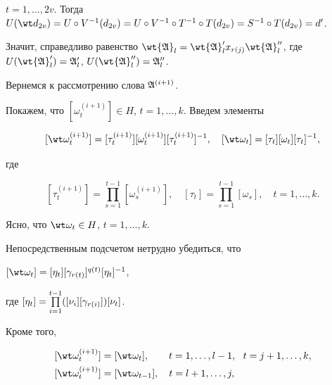 $t=1,\dotsc,2v$. Тогда $U(\wt d_{2v})=U\circ


V^{-1}(d_{2v})=U\circ V^{-1}\circ T^{-1}


\circ T(d_{2v})=S^{-1}\circ T(d_{{2v}})=d'$.


Значит, справедливо равенство $\wt{\frak A}_l=


\wt{\frak A}'_lx_{r(j)}\wt{\frak A}''_l$, где $U(\wt{\frak A}'_l)=


\frak A'_l$, $U(\wt{\frak A}''_l)=\frak A''_l$.





Вернемся к рассмотрению слова $\frak A^{(i+1)}$.


Покажем, что $[\omega^{(i+1)}_t]\in H$, $t=1,\dotsc,k$. Введем элементы


\begin{equation}


\label{(17.18)}


[\wt\omega_t^{(i+1)}]=[\tau_t^{(i+1)}][{\omega}_t^{(i+1)}]


[\tau_t^{(i+1)}]^{-1},\quad [\wt\omega_t]=[\tau_t][\omega_t][\tau_t]^{-1},


\end{equation}


где


$$


[\tau_t^{(i+1)}]=\prod_{s=1}^{t-1}[\omega_s^{(i+1)}],\quad


[\tau_t]=\prod_{s=1}^{t-1}[{\omega}_s],\quad t=1,\dotsc,k.


$$


Ясно, что $\wt\omega_t\in H$, $t=1,\dotsc,k$.


Непосредственным подсчетом нетрудно убедиться, что


$[\wt\omega_t]=[\eta_t][\gamma_{r(t)}]^{q(t)}[\eta_t]^{-1}$,


где $[\eta_t]=\prod\limits_{i=1}^{t-1}([\nu_i][\gamma_{r(i)}])[\nu_t]$.


Кроме того,


\begin{equation}


\begin{split}


[\wt\omega_t^{(i+1)}]&=


[\wt\omega_t],\qquad t=1,\dotsc,l-1,\ \ t=j+1,\dotsc,k,\\


[\wt\omega_t^{(i+1)}]&=[\wt\omega_{t-1}],\quad t=l+1,\dotsc,j,


\end{split}


\label{(17.19)}


\end{equation}



